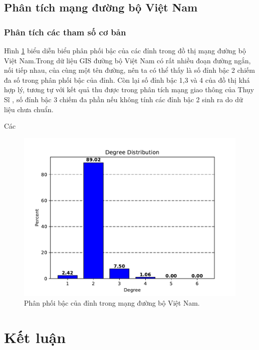 \documentclass[14pt, oneside, a4paper, openany]{scrartcl}
\begin{document}
\subsection{Phân tích mạng đường bộ Việt Nam}
\newpage
\subsubsection{Phân tích các tham số cơ bản}
Hình \ref{fig:degreedist} biểu diễn biểu phân phối bậc của các đỉnh trong đồ thị mạng đường bộ Việt Nam.Trong dữ liệu GIS đường bộ Việt Nam có rất nhiều đoạn đường ngắn, nối tiếp nhau, của cùng một tên đường, nên ta có thể thấy là số đỉnh bậc 2 chiếm đa số trong phân phối bậc của đỉnh. Còn lại số đỉnh bậc 1,3 và 4 của đồ thị khá hợp lý, tương tự với kết quả thu được trong phân tích mạng giao thông của Thụy Sĩ \cite{swissroad}, số đỉnh bậc 3 chiếm đa phần nếu không tính các đỉnh bậc 2 sinh ra do dữ liệu chưa chuẩn.

Các 

\begin{figure}[!h]
	\centering
	\includegraphics[scale=0.8]{figures/degreedist.pdf} 
	\caption[Phân phối bậc của đỉnh trong mạng đường bộ Việt Nam]{Phân phối bậc của đỉnh trong mạng đường bộ Việt Nam.}
	\label{fig:degreedist}
\end{figure}

\section{Kết luận}
\end{document}
